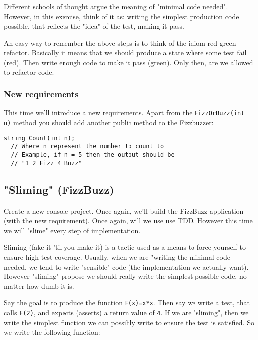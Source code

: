 \documentclass{article}
\begin{document}
    Different schools of thought argue the meaning of "minimal code needed". However, in this exercise, think of it as: writing the simplest production code possible, that reflects the "idea" of the test, making it pass.

    An easy way to remember the above steps is to think of the idiom red-green-refactor. Basically it means that we should produce a state where some test fail (red). Then write enough code to make it pass (green). Only then, are we allowed to refactor code.

    \subsubsection*{New requirements}
    This time we'll introduce a new requirements. Apart from the \texttt{FizzOrBuzz(int n)} method you should add another public method to the Fizzbuzzer:

    \begin{lstlisting}
string Count(int n);
  // Where n represent the number to count to
  // Example, if n = 5 then the output should be
  // "1 2 Fizz 4 Buzz"
    \end{lstlisting}

  \subsection{ "Sliming" (FizzBuzz) }
    \paragraph{}
      Create a new console project. Once again, we'll build the FizzBuzz application (with the new requirement). Once again, will we use use TDD. However this time we will "slime" every step of implementation.

      Sliming (fake it 'til you make it) is a tactic used as a means to force yourself to ensure high test-coverage. Usually, when we are "writing the minimal code needed, we tend to write "sensible" code (the implementation we actually want). However "sliming" propose we should really write the simplest possible code, no matter how dumb it is.

      Say the goal is to produce the function \texttt{F(x)=x*x}. Then say we write a test, that calls \texttt{F(2)}, and expects (asserts) a return value of \texttt{4}. If we are "sliming", then we write the simplest function we can possibly write to ensure the test is satisfied. So we write the following function:
\end{document}
